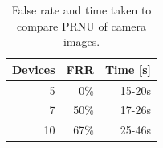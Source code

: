 \begin{table}[htbp]
  \centering
    \begin{tabular}{rrr}
    \toprule
    Devices & FRR & Time [s] \\
    \midrule
    5     & 0\%   & 15-20s \\
    7     & 50\%  & 17-26s \\
    10    & 67\%  & 25-46s \\
    \bottomrule
    \end{tabular}%
    \caption{False rate and time taken to compare PRNU of camera images.}
  \label{tab:falseCam}%
\end{table}%


